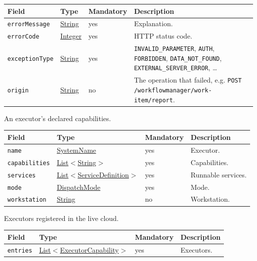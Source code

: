 \documentclass[a4paper]{arrowhead}
\newcommand{\mref}[1]{{\textcolor{ArrowheadPurple}{\hyperref[sec:model:#1]{#1}}}}
\newcommand{\pref}[1]{{\textcolor{ArrowheadGrey}{\hyperref[sec:model:primitives:#1]{#1}}}}
\begin{document}
{\small
\begin{longtable}{|p{3.7cm}|p{4.2cm}|p{1.6cm}|p{6.3cm}|}

\hline
\rowcolor{gray!33} Field & Type & Mandatory & Description \\ \hline
\endhead
\texttt{errorMessage} & \pref{String} & yes & Explanation. \\ \hline
\texttt{errorCode} & \pref{Integer} & yes & HTTP status code. \\ \hline
\texttt{exceptionType} & \pref{String} & yes & \texttt{INVALID\_\allowbreak{}PARAMETER}, \texttt{AUTH}, \texttt{FORBIDDEN}, \texttt{DATA\_\allowbreak{}NOT\_\allowbreak{}FOUND}, \texttt{EXTERNAL\_\allowbreak{}SERVER\_\allowbreak{}ERROR}, \ldots \\ \hline
\texttt{origin} & \pref{String} & no & The operation that failed, e.g. \texttt{POST /\allowbreak{}workflowmanager/\allowbreak{}work-\allowbreak{}item/\allowbreak{}report}. \\ \hline
\end{longtable}
}

An executor's declared capabilities.

{\small
\begin{longtable}{|p{3.7cm}|p{4.2cm}|p{1.6cm}|p{6.3cm}|}

\hline
\rowcolor{gray!33} Field & Type & Mandatory & Description \\ \hline
\endhead
\texttt{name} & \pref{SystemName} & yes & Executor. \\ \hline
\texttt{capabilities} & \pref{List}$<$\pref{String}$>$ & yes & Capabilities. \\ \hline
\texttt{services} & \pref{List}$<$\pref{ServiceDefinition}$>$ & yes & Runnable services. \\ \hline
\texttt{mode} & \mref{DispatchMode} & yes & Mode. \\ \hline
\texttt{workstation} & \pref{String} & no & Workstation. \\ \hline
\end{longtable}
}

Executors registered in the live cloud.

{\small
\begin{longtable}{|p{3.7cm}|p{4.2cm}|p{1.6cm}|p{6.3cm}|}

\hline
\rowcolor{gray!33} Field & Type & Mandatory & Description \\ \hline
\endhead
\texttt{entries} & \pref{List}$<$\mref{ExecutorCapability}$>$ & yes & Executors. \\ \hline
\end{longtable}
}
\end{document}
